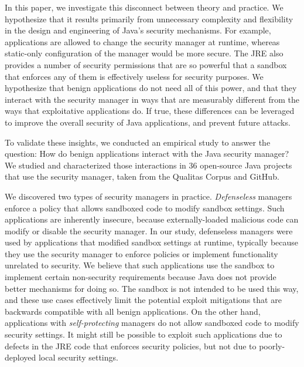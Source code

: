 \documentclass{sig-alternate}
\begin{document}
In this paper, we investigate this disconnect between theory and practice. We
hypothesize that it results primarily from unnecessary complexity and flexibility
in the design and engineering of Java's security mechanisms. For example,
applications are allowed to change the security manager at runtime, whereas
static-only configuration of the manager would be more secure. The JRE also
provides a number of security permissions that are so powerful that a sandbox
that enforces any of them is effectively useless for security purposes. We
hypothesize that benign applications do not need all of this power, and that
they interact with the security manager in ways
that are measurably different from the ways that exploitative applications do.
If true, these differences can be leveraged to improve the overall security of
Java applications, and prevent future attacks.


To validate these insights, we conducted an empirical study
to answer the question: How do benign
applications interact with the Java security manager? We studied and
characterized those interactions in 36
open-source Java projects that use the security manager, taken from the Qualitas
Corpus \cite{QualitasCorpus:APSEC:2010} and GitHub.


We discovered two types of security managers in
practice. \emph{Defenseless} managers enforce a policy that allows sandboxed code
to modify sandbox settings. Such applications
are inherently insecure, because externally-loaded malicious code can
modify or disable the security manager. In our study, defenseless managers were
used by applications that modified sandbox settings at runtime, typically because
they use the security manager to enforce policies or implement functionality
unrelated to security. We believe that such applications use the
sandbox to implement certain non-security requirements
because Java does not provide better mechanisms for doing so.
The sandbox is not intended to be used this way, and these use cases
effectively limit the potential exploit mitigations that are
backwards compatible with all benign applications.
On the other hand, applications with \emph{self-protecting} managers do
not allow sandboxed code to modify security settings.
It might still be possible to exploit
such applications due to defects in the JRE code that enforces security
policies, but not due to poorly-deployed local security settings.
\end{document}
